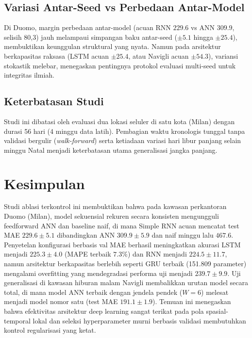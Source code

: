 \documentclass[conference,a4paper]{IEEEtran}
\begin{document}
\subsection{Variasi Antar-Seed vs Perbedaan Antar-Model}
Di Duomo, margin perbedaan antar-model (acuan RNN $229.6$ vs ANN $309.9$, selisih 80,3) jauh melampaui simpangan baku antar-seed ($\pm 5.1$ hingga $\pm 25.4$), membuktikan keunggulan struktural yang nyata. Namun pada arsitektur berkapasitas raksasa (LSTM acuan $\pm 25.4$, atau Navigli acuan $\pm 54.3$), variansi stokastik melebar, menegaskan pentingnya protokol evaluasi multi-seed untuk integritas ilmiah.

\subsection{Keterbatasan Studi}
Studi ini dibatasi oleh evaluasi dua lokasi seluler di satu kota (Milan) dengan durasi 56 hari (4 minggu data latih). Pembagian waktu kronologis tunggal tanpa validasi bergulir (\textit{walk-forward}) serta ketiadaan variasi hari libur panjang selain minggu Natal menjadi keterbatasan utama generalisasi jangka panjang.

\section{Kesimpulan}

Studi ablasi terkontrol ini membuktikan bahwa pada kawasan perkantoran Duomo (Milan), model sekuensial rekuren secara konsisten mengungguli feedforward ANN dan baseline naif, di mana Simple RNN acuan mencatat test MAE $229.6 \pm 5.1$ dibandingkan ANN $309.9 \pm 5.9$ dan naif minggu lalu $467.6$. Penyetelan konfigurasi berbasis val MAE berhasil meningkatkan akurasi LSTM menjadi $225.3 \pm 4.0$ (MAPE terbaik $7.3\%$) dan RNN menjadi $224.5 \pm 11.7$, namun arsitektur berkapasitas berlebih seperti GRU terbaik (151.809 parameter) mengalami overfitting yang mendegradasi performa uji menjadi $239.7 \pm 9.9$. Uji generalisasi di kawasan hiburan malam Navigli membalikkan urutan model secara total, di mana model ANN terbaik dengan jendela pendek ($W=6$) melesat menjadi model nomor satu (test MAE $191.1 \pm 1.9$). Temuan ini menegaskan bahwa efektivitas arsitektur deep learning sangat terikat pada pola spasial-temporal lokal dan seleksi hyperparameter murni berbasis validasi membutuhkan kontrol regularisasi yang ketat.

\end{document}
